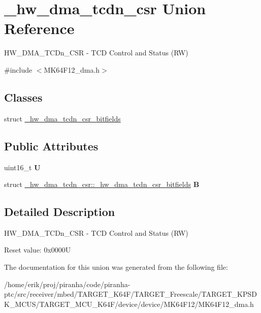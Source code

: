 \hypertarget{union__hw__dma__tcdn__csr}{}\section{\+\_\+hw\+\_\+dma\+\_\+tcdn\+\_\+csr Union Reference}
\label{union__hw__dma__tcdn__csr}


H\+W\+\_\+\+D\+M\+A\+\_\+\+T\+C\+Dn\+\_\+\+C\+SR -\/ T\+CD Control and Status (RW)  




{\ttfamily \#include $<$M\+K64\+F12\+\_\+dma.\+h$>$}

\subsection*{Classes}
\begin{DoxyCompactItemize}
\item 
struct \hyperlink{struct__hw__dma__tcdn__csr_1_1__hw__dma__tcdn__csr__bitfields}{\+\_\+hw\+\_\+dma\+\_\+tcdn\+\_\+csr\+\_\+bitfields}
\end{DoxyCompactItemize}
\subsection*{Public Attributes}
\begin{DoxyCompactItemize}
\item 
uint16\+\_\+t {\bfseries U}\hypertarget{union__hw__dma__tcdn__csr_a5a83330072535927e2521b40c746a68d}{}\label{union__hw__dma__tcdn__csr_a5a83330072535927e2521b40c746a68d}

\item 
struct \hyperlink{struct__hw__dma__tcdn__csr_1_1__hw__dma__tcdn__csr__bitfields}{\+\_\+hw\+\_\+dma\+\_\+tcdn\+\_\+csr\+::\+\_\+hw\+\_\+dma\+\_\+tcdn\+\_\+csr\+\_\+bitfields} {\bfseries B}\hypertarget{union__hw__dma__tcdn__csr_ad3f0416550bf83c55192ef8dfe516690}{}\label{union__hw__dma__tcdn__csr_ad3f0416550bf83c55192ef8dfe516690}

\end{DoxyCompactItemize}


\subsection{Detailed Description}
H\+W\+\_\+\+D\+M\+A\+\_\+\+T\+C\+Dn\+\_\+\+C\+SR -\/ T\+CD Control and Status (RW) 

Reset value\+: 0x0000U 

The documentation for this union was generated from the following file\+:\begin{DoxyCompactItemize}
\item 
/home/erik/proj/piranha/code/piranha-\/ptc/src/receiver/mbed/\+T\+A\+R\+G\+E\+T\+\_\+\+K64\+F/\+T\+A\+R\+G\+E\+T\+\_\+\+Freescale/\+T\+A\+R\+G\+E\+T\+\_\+\+K\+P\+S\+D\+K\+\_\+\+M\+C\+U\+S/\+T\+A\+R\+G\+E\+T\+\_\+\+M\+C\+U\+\_\+\+K64\+F/device/device/\+M\+K64\+F12/M\+K64\+F12\+\_\+dma.\+h\end{DoxyCompactItemize}
